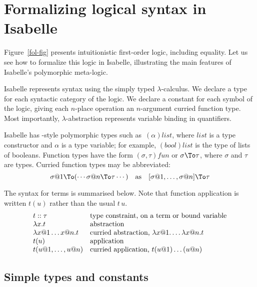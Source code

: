 \section{Formalizing logical syntax in Isabelle}\label{sec:logical-syntax}

Figure~\ref{fol-fig} presents intuitionistic first-order logic,
including equality.  Let us see how to formalize
this logic in Isabelle, illustrating the main features of Isabelle's
polymorphic meta-logic.

Isabelle represents syntax using the simply typed $\lambda$-calculus.  We
declare a type for each syntactic category of the logic.  We declare a
constant for each symbol of the logic, giving each $n$-place operation an
$n$-argument curried function type.  Most importantly,
$\lambda$-abstraction represents variable binding in quantifiers.

Isabelle has \ML-style polymorphic types such as~$(\alpha)list$, where
$list$ is a type constructor and $\alpha$ is a type variable; for example,
$(bool)list$ is the type of lists of booleans.  Function types have the
form $(\sigma,\tau)fun$ or $\sigma\To\tau$, where $\sigma$ and $\tau$ are
types.  Curried function types may be abbreviated:
\[  \sigma@1\To (\cdots \sigma@n\To \tau\cdots)  \quad \hbox{as} \quad
   [\sigma@1, \ldots, \sigma@n] \To \tau \]
 
The syntax for terms is summarised below.  Note that function application is
written $t(u)$ rather than the usual $t\,u$.
\[ 
\index{lambda abs@$\lambda$-abstractions}\index{function applications}
\begin{array}{ll}
  t :: \tau   & \hbox{type constraint, on a term or bound variable} \\
  \lambda x.t   & \hbox{abstraction} \\
  \lambda x@1\ldots x@n.t
        & \hbox{curried abstraction, $\lambda x@1. \ldots \lambda x@n.t$} \\
  t(u)          & \hbox{application} \\
  t (u@1, \ldots, u@n) & \hbox{curried application, $t(u@1)\ldots(u@n)$} 
\end{array}
\]


\subsection{Simple types and constants} 

